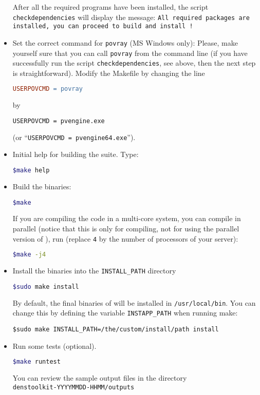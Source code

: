 \begin{itemize}
After all the required programs have been installed, the script \texttt{checkdependencies} will display the message: \texttt{All required packages are installed, you can proceed to build and install \DTK!}
\item Set the correct command for \texttt{povray} (MS Windows only): Please, make yourself sure that you can call \texttt{povray} from the command line (if you have successfully run the script \texttt{checkdependencies}, see above, then the next step is straightforward). Modify the Makefile by changing the line
\begin{lstlisting}[language=make]
USERPOVCMD = povray
\end{lstlisting}
by
\begin{lstlisting}[language=bash]
USERPOVCMD = pvengine.exe
\end{lstlisting}
(or ``\texttt{USERPOVCMD = pvengine64.exe}'').
%
\item Initial help for building the suite. Type:
\begin{lstlisting}[language=bash]
$make help
\end{lstlisting}
%
\item Build the \DTK{} binaries:
\begin{lstlisting}[language=bash]
$make
\end{lstlisting}
If you are compiling the code in a multi-core system, you can compile in parallel (notice that
this is  only for compiling, not for using the parallel version of \DTK), run (replace \texttt{4}
by the number of processors of your server):
%
\begin{lstlisting}[language=bash]
$make -j4
\end{lstlisting}
%
\item Install the binaries into the \texttt{INSTALL\_PATH} directory
  \begin{lstlisting}[language=bash]
$sudo make install
\end{lstlisting}
   By default, the final binaries of \DTK{} will be installed in \texttt{/usr/local/bin}.
   You can change this by defining the variable \texttt{INSTAPP\_PATH} when running make:
\begin{lstlisting}
$sudo make INSTALL_PATH=/the/custom/install/path install
\end{lstlisting}
\item Run some tests (optional).
\begin{lstlisting}[language=bash]
$make runtest
\end{lstlisting}
 You can review the sample output files in the directory\\
\texttt{denstoolkit-YYYYMMDD-HHMM/outputs}
\end{itemize}


